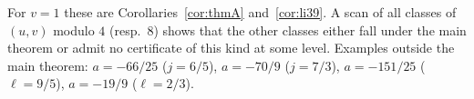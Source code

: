 \begin{remark}
  For $v = 1$ these are Corollaries~\ref{cor:thmA} and~\ref{cor:li39}. A scan of all classes of
  $(u, v)$ modulo $4$ (resp.\ $8$) shows that the other classes either fall under the main
  theorem or admit no certificate of this kind at some level. Examples outside the main theorem:
  $a = -66/25$ ($j = 6/5$), $a = -70/9$ ($j = 7/3$), $a = -151/25$ ($\ell = 9/5$),
  $a = -19/9$ ($\ell = 2/3$).
\end{remark}
